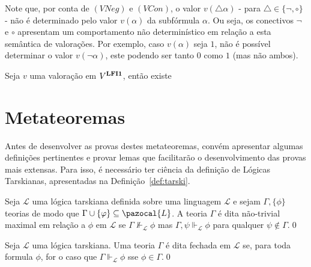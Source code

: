         Note que, por conta de $(VNeg)$ e $(VCon)$, o valor $v(\triangle \alpha)$ {-} para $\triangle \in \{\neg, \circ\}$ {-} não é determinado pelo valor $v(\alpha)$ da subfórmula $\alpha$. Ou seja, os conectivos $\neg$ e $\circ$ apresentam um comportamento não determinístico em relação a esta semântica de valorações. Por exemplo, caso $v(\alpha)$ seja $1$, não é possível determinar o valor  $v(\neg \alpha)$, este podendo ser tanto $0$ como $1$ (mas não ambos).
        
        \begin{lema}
            \label{lem:matval}
            Seja $v$ uma valoração em $V^{\textbf{LFI1}{}}$, então existe
        \end{lema}
                
\section{Metateoremas}
    \label{sec:metateoremas}
    Antes de desenvolver as provas destes metateoremas, convém apresentar algumas definições pertinentes e provar lemas que facilitarão o desenvolvimento das provas mais extensas. Para isso, é necessário ter ciência da definição de Lógicas Tarskianas, apresentadas na Definição~\ref{def:tarski}.

    \begin{definicao}
        \label{def:nao-trivial_maximal}
        Seja $\mathcal{L}$ uma lógica tarskiana definida sobre uma linguagem $\mathcal{L}$ e sejam $\Gamma, \{\phi\}$ teorias de modo que $\Gamma \cup \{\phi\} \subseteq \pazocal{L}$. A teoria $\Gamma$ é dita não-trivial maximal em relação a $\phi$ em $\mathcal{L}$ se $\Gamma \nVdash_{\mathcal{L}} \phi$ mas $\Gamma, \psi \Vdash_{\mathcal{L}} \phi$ para qualquer $\psi \notin \Gamma$.\qed{}
    \end{definicao}

     

    \begin{definicao}
        \label{def:fechada}

        Seja $\mathcal{L}$ uma lógica tarskiana. Uma teoria $\Gamma$ é dita fechada em $\mathcal{L}$ se, para toda formula $\phi$, for o caso que $\Gamma \Vdash_{\mathcal{L}} \phi$ sse $\phi \in \Gamma$.\qed{}
    \end{definicao}

